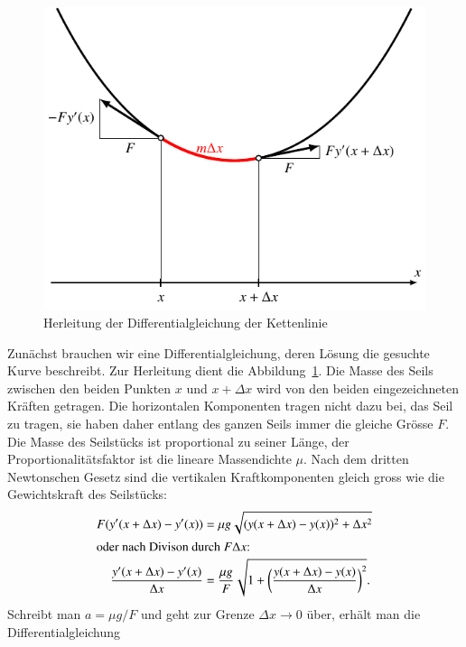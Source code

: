 \begin{loesung}
\def\asinh{\operatorname{arsinh}}
\begin{figure}
\centering
\includegraphics{chapters/50-ode/figures/kettenlinie.pdf}
\caption{Herleitung der Differentialgleichung der Kettenlinie
\label{numerik:kettenlinie}}
\end{figure}
Zunächst brauchen wir eine Differentialgleichung, deren Lösung die
gesuchte Kurve beschreibt.
Zur Herleitung dient die Abbildung~\ref{numerik:kettenlinie}.
Die Masse des Seils zwischen den beiden Punkten $x$ und $x+\Delta x$
wird von den beiden eingezeichneten Kräften getragen.
Die horizontalen Komponenten tragen nicht dazu bei, das Seil zu
tragen, sie haben daher entlang des ganzen Seils immer die gleiche
Grösse $F$.
Die Masse des Seilstücks ist proportional zu seiner Länge,
der Proportionalitätsfaktor ist die lineare Massendichte $\mu$.
Nach dem dritten Newtonschen Gesetz
sind die vertikalen Kraftkomponenten gleich gross wie die Gewichtskraft
des Seilstücks:
\begin{align*}
F(y'(x+\Delta x)-y'(x))
&= \mu g\sqrt{(y(x+\Delta x)-y(x))^2+\Delta x^2}
\\
\intertext{oder nach Divison durch $F\Delta x$:}
\frac{y'(x+\Delta x)-y'(x)}{\Delta x}
&=\frac{\mu g}{F}\sqrt{1+\biggl(\frac{y(x+\Delta x)-y(x)}{\Delta x}\biggr)^2}.
\end{align*}
Schreibt man $a=\mu g/F$ und geht zur Grenze $\Delta x\to 0$ über,
erhält man die Differentialgleichung
\begin{equation}

\end{equation}
\end{loesung}
